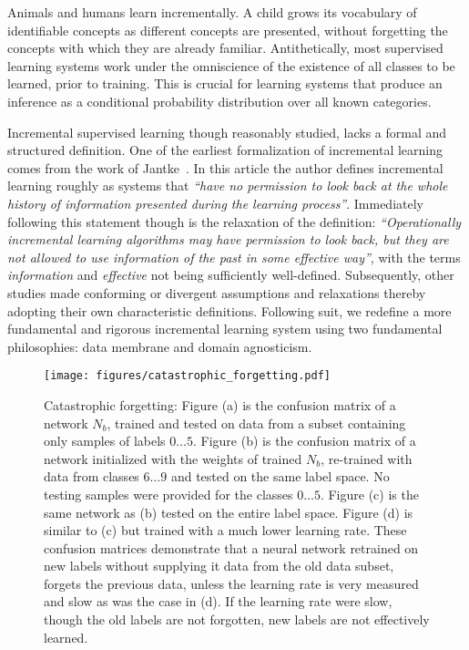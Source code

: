 \documentclass[10pt,twocolumn,letterpaper]{article}
\begin{document}
	Animals and humans learn incrementally. 
	A child grows its vocabulary of identifiable concepts as different concepts are presented, without forgetting the concepts with which they are already familiar. 
	Antithetically, most supervised learning systems work under the omniscience of the existence of all classes to be learned, prior to training.
	This is crucial for learning systems that produce an inference as a conditional probability distribution over all known categories.
	
	Incremental supervised learning though reasonably studied, lacks a formal and structured definition. 
	One of the earliest formalization of incremental learning comes from the work of Jantke~\cite{jantke1993types}. 
	In this article the author defines incremental learning roughly as systems that \emph{``have no permission to look back at the whole history of information presented during the learning process''}. 
	Immediately following this statement though is the relaxation of the definition: \emph{``Operationally incremental learning algorithms may have permission to look back, but they are not allowed to use information of the past in some effective way''}, with the terms \emph{information} and \emph{effective} not being sufficiently well-defined.  
	Subsequently, other studies made conforming or divergent assumptions and relaxations thereby adopting their own characteristic definitions.
	Following suit, we redefine a more fundamental and rigorous incremental learning system using two fundamental philosophies: data membrane and domain agnosticism. 
	
	\begin{figure*}[!ht]
		\begin{center}
			\texttt{[image: figures/catastrophic\_forgetting.pdf]}
		\end{center}
		
		\caption{Catastrophic forgetting: Figure (a) is the confusion matrix of a network $N_b$, trained and tested on data from a subset containing only samples of labels $0 \hdots 5$. 
			Figure (b) is the confusion matrix of a network initialized with the weights of trained $N_b$, re-trained with data from classes $6 \hdots 9$ and tested on the same label space. No testing samples were provided for the classes $0 \hdots 5$. 
			Figure (c) is the same network as (b) tested on the entire label space. Figure (d) is similar to (c) but trained with a much lower learning rate. These confusion matrices demonstrate that a neural network retrained on new labels without supplying it data from the old data subset, forgets the previous data, unless the learning rate is very measured and slow as was the case in (d). 
			If the learning rate were slow, though the old labels are not forgotten, new labels are not effectively learned.}
		
		\label{fig:forgetting}
	\end{figure*}
	
\end{document}
